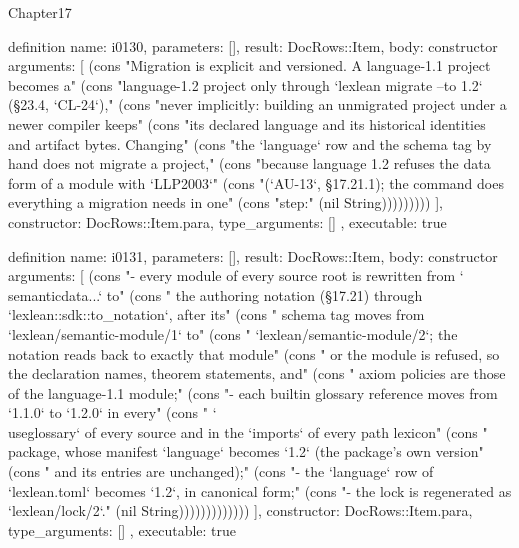 \begin{lexlean}{Chapter17}
\begin{semanticmodule}
definition{
  name: i0130,
  parameters: [],
  result: DocRows::Item,
  body: constructor{
    arguments: [
      (cons "Migration is explicit and versioned. A language-1.1 project becomes a" (cons "language-1.2 project only through `lexlean migrate --to 1.2` (§23.4, `CL-24`)," (cons "never implicitly: building an unmigrated project under a newer compiler keeps" (cons "its declared language and its historical identities and artifact bytes. Changing" (cons "the `language` row and the schema tag by hand does not migrate a project," (cons "because language 1.2 refuses the data form of a module with `LLP2003`" (cons "(`AU-13`, §17.21.1); the command does everything a migration needs in one" (cons "step:" (nil String)))))))))
    ],
    constructor: DocRows::Item.para,
    type_arguments: []
  },
  executable: true
}

definition{
  name: i0131,
  parameters: [],
  result: DocRows::Item,
  body: constructor{
    arguments: [
      (cons "- every module of every source root is rewritten from `\\semanticdata{...}` to" (cons "  the authoring notation (§17.21) through `lexlean::sdk::to_notation`, after its" (cons "  schema tag moves from `lexlean/semantic-module/1` to" (cons "  `lexlean/semantic-module/2`; the notation reads back to exactly that module" (cons "  or the module is refused, so the declaration names, theorem statements, and" (cons "  axiom policies are those of the language-1.1 module;" (cons "- each builtin glossary reference moves from `1.1.0` to `1.2.0` in every" (cons "  `\\useglossary` of every source and in the `imports` of every path lexicon" (cons "  package, whose manifest `language` becomes `1.2` (the package's own version" (cons "  and its entries are unchanged);" (cons "- the `language` row of `lexlean.toml` becomes `1.2`, in canonical form;" (cons "- the lock is regenerated as `lexlean/lock/2`." (nil String)))))))))))))
    ],
    constructor: DocRows::Item.para,
    type_arguments: []
  },
  executable: true
}


\end{semanticmodule}
\end{lexlean}

